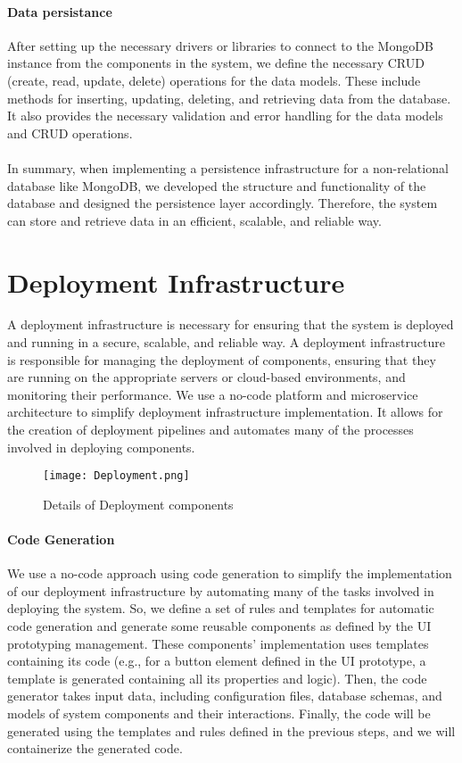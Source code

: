 \paragraph{Data persistance}
After setting up the necessary drivers or libraries to connect to the MongoDB instance from the components in the system, we define the necessary CRUD (create, read, update, delete) operations for the data models.
These include methods for inserting, updating, deleting, and retrieving data from the database. 
It also provides the necessary validation and error handling for the data models and CRUD operations.\\\\
In summary, when implementing a persistence infrastructure for a non-relational database like MongoDB, we developed the structure and functionality of the database and designed the persistence layer accordingly. 
Therefore, the system can store and retrieve data in an efficient, scalable, and reliable way.

\clearpage
\section{Deployment Infrastructure}
\label{sc:section:deployment}
A deployment infrastructure is necessary for ensuring that the system is deployed and running in a secure, scalable, and reliable way. 
A deployment infrastructure is responsible for managing the deployment of components, ensuring that they are running on the appropriate servers or cloud-based environments, and monitoring their performance.
We use a no-code platform and microservice architecture to simplify deployment infrastructure implementation. It allows for the creation of deployment pipelines and automates many of the processes involved in deploying components.

\begin{figure}[htbp!]
    \centering    
    \texttt{[image: Deployment.png]} 
    \caption[Details of Deployment components]{Details of Deployment components}
    \label{fig:sc:deployment}
\end{figure}

\paragraph{Code Generation}
We use a no-code approach using code generation to simplify the implementation of our deployment infrastructure by automating many of the tasks involved in deploying the system.
So, we define a set of rules and templates for automatic code generation and generate some reusable components as defined by the UI prototyping management. 
These components' implementation uses templates containing its code (e.g., for a button element defined in the UI prototype, a template is generated containing all its properties and logic).
Then, the code generator takes input data, including configuration files, database schemas, and models of system components and their interactions. 
Finally, the code will be generated using the templates and rules defined in the previous steps, and we will containerize the generated code. 

